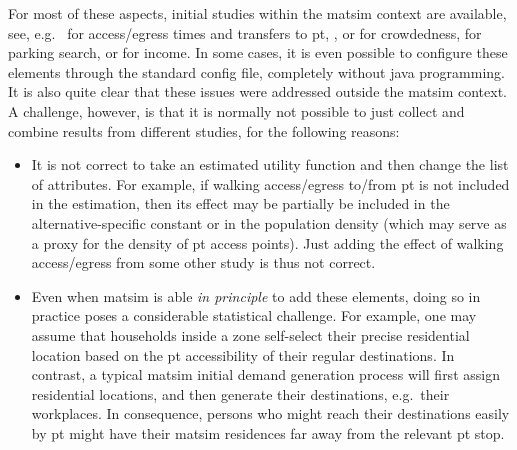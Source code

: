 For most of these aspects, initial studies within the \gls{matsim} context are available, see, e.g.\ 
%
\citet{MoyoNagelptLineCalibration,MoyoNagelptNetCalibration} for access/egress times and transfers to \acrfull{pt}, 
%
\citet{BoumanEtc2013Crowdedness},
\citet[][]{SunEtAl_TechRep_IVT_2014}
or \citet{erath_using_smartcard_data}
for crowdedness,
%
\cite{WaraichEtAl_STRC_2013} for parking search,
%
or \cite{KickhoeferEtAl2011PolicyEvaluationIncome} for income.
%
In some cases, it is even possible to configure these elements through the standard config file, completely without \gls{java} programming.
%
It is also quite clear that these issues were addressed outside the \gls{matsim} context.
%
A challenge, however, is that it is normally not possible to just collect and combine results from different studies, for the following reasons:
\begin{itemize}

\item It is not correct to take an estimated utility function and then change the list of attributes.  
%
For example, if walking access/egress to/from \gls{pt} is not included in the estimation, then its effect may be partially be included in the alternative-specific constant or in the population density (which may serve as a proxy for the density of \gls{pt} access points).  Just adding the effect of walking access/egress from some other study is thus not correct.

\item Even when \gls{matsim} is able \emph{in principle} to add these elements, doing so in practice poses a considerable statistical challenge.  For example, one may assume that households inside a zone self-select their precise residential location based on the \gls{pt} accessibility of their regular destinations.  
%
In contrast, a typical \gls{matsim} initial demand generation process will first assign residential locations, and then generate their destinations, e.g.\ their workplaces.
%
In consequence, persons who might reach their destinations easily by \gls{pt} might have their \gls{matsim} residences far away from the relevant \gls{pt} stop.

\end{itemize}

